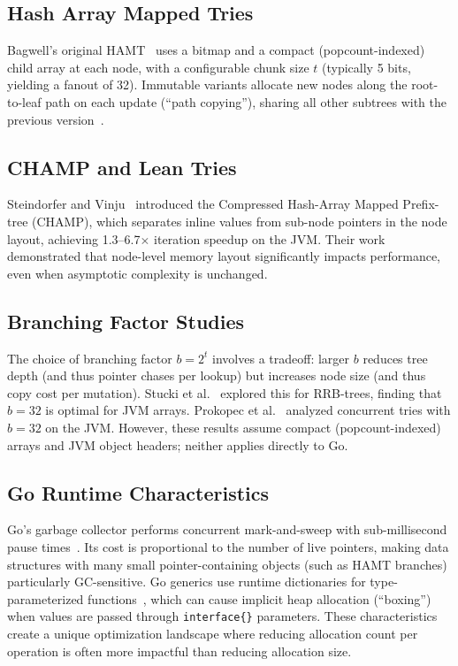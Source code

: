 \documentclass[11pt,twocolumn]{article}
\begin{document}
\subsection{Hash Array Mapped Tries}

Bagwell's original HAMT~\cite{bagwell2001} uses a bitmap and a compact
(popcount-indexed) child array at each node, with a configurable chunk size
$t$ (typically 5 bits, yielding a fanout of 32).
Immutable variants allocate new nodes along the root-to-leaf path on each
update (``path copying''), sharing all other subtrees with the previous
version~\cite{driscoll1989}.

\subsection{CHAMP and Lean Tries}

Steindorfer and Vinju~\cite{steindorfer2015} introduced the Compressed
Hash-Array Mapped Prefix-tree (CHAMP), which separates inline values from
sub-node pointers in the node layout, achieving 1.3--6.7$\times$ iteration
speedup on the JVM.
Their work demonstrated that node-level memory layout significantly impacts
performance, even when asymptotic complexity is unchanged.

\subsection{Branching Factor Studies}

The choice of branching factor $b = 2^t$ involves a tradeoff: larger $b$
reduces tree depth (and thus pointer chases per lookup) but increases node
size (and thus copy cost per mutation).
Stucki et al.~\cite{stucki2015} explored this for RRB-trees, finding that
$b = 32$ is optimal for JVM arrays.
Prokopec et al.~\cite{prokopec2012} analyzed concurrent tries with
$b = 32$ on the JVM.
However, these results assume compact (popcount-indexed) arrays and JVM
object headers; neither applies directly to Go.

\subsection{Go Runtime Characteristics}

Go's garbage collector performs concurrent mark-and-sweep with sub-millisecond
pause times~\cite{hudson2018}.
Its cost is proportional to the number of live pointers, making data
structures with many small pointer-containing objects (such as HAMT branches)
particularly GC-sensitive.
Go generics use runtime dictionaries for type-parameterized
functions~\cite{go118}, which can cause implicit heap allocation (``boxing'')
when values are passed through \texttt{interface\{\}} parameters.
These characteristics create a unique optimization landscape where reducing
allocation count per operation is often more impactful than reducing
allocation size.
\end{document}

